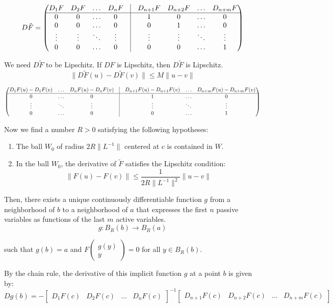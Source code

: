 \documentclass[11pt]{article}
\begin{document}
\[
D\tilde{F} = \begin{pmatrix}
    D_1 F & D_2 F & \ldots & D_n F & \vline & D_{n+1} F & D_{n+2} F & \ldots & D_{n+m} F \\
    \hline 
    0 & 0 & \ldots & 0 & \vline & 1 & 0 & \ldots & 0 \\
    0 & 0 & \ldots & 0 & \vline & 0 & 1 & \ldots & 0 \\
    \vdots & \vdots & \ddots & \vdots & \vline & \vdots & \vdots & \ddots & \vdots \\
    0 & 0 & \ldots & 0 & \vline & 0 & 0 & \ldots & 1
\end{pmatrix}
\]

We need $D \tilde{F}$ to be Lipschitz. If $DF$ is Lipschitz, then $D \tilde{F}$ is Lipschitz.
\[
\|D \tilde{F}(u) - D \tilde{F}(v)\| \leq M \|u - v\|
\]

\[
\begin{pmatrix}
    D_1 F(u) - D_1 F(v) & \ldots & D_n F(u) - D_n F(v) & \vline & D_{n+1} F(u) - D_{n+1} F(v) & \ldots & D_{n+m} F(u) - D_{n+m} F(v) \\
    \hline
    0 & \ldots & 0 & \vline & 1 & \ldots & 0 \\
    \vdots & \ddots & \vdots & \vline & \vdots & \ddots & \vdots \\
    0 & \ldots & 0 & \vline & 0 & \ldots & 1
\end{pmatrix} 
\]

Now we find a number $R > 0$ satisfying the following hypotheses:
\begin{enumerate}
    \item The ball $W_0$ of radius $2R \|L^{-1}\|$ centered at $c$ is contained in $W$.
    \item In the ball $W_0$, the derivative of $\tilde{F}$ satisfies the Lipschitz condition:
    \[
    \|F(u) - F(v)\| \leq \frac{1}{2R \|L^{-1}\|^2} \|u - v\|
    \]
\end{enumerate}

Then, there exists a unique continuously differentiable function $g$ from a neighborhood of $b$ to a neighborhood of $a$ that expresses the first $n$ passive variables as functions of the last $m$ active variables.
\[
g : B_R(b) \rightarrow B_R(a)
\]

such that $g(b) = a$ and $F \begin{pmatrix}
    g(y) \\
    y
\end{pmatrix} = 0$ for all $y \in B_R(b)$.

By the chain rule, the derivative of this implicit function $g$ at a point $b$ is given by:
\[
Dg(b) = - \begin{bmatrix}
    D_1 F(c) & D_2 F(c) & \ldots & D_n F(c)
\end{bmatrix}^{-1} \begin{bmatrix}
    D_{n+1} F(c) & D_{n+2} F(c) & \ldots & D_{n+m} F(c)
\end{bmatrix}
\]
\end{document}
